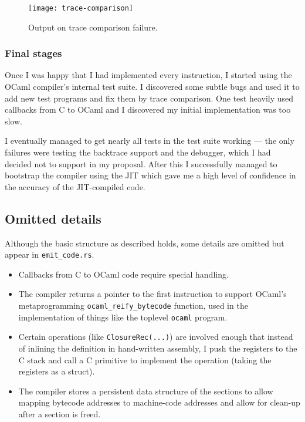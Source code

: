 \begin{figure}[h]
      \texttt{[image: trace-comparison]}
      \caption{Output on trace comparison failure.}
      \label{fig:trace-comparison}
\end{figure}

\subsubsection{Final stages}

Once I was happy that I had implemented every instruction, I started using
the OCaml compiler's internal test suite. I discovered some subtle bugs and used it to add new test
programs and fix them by trace comparison. One test heavily used callbacks from C to OCaml and I
discovered my initial implementation was too slow.

I eventually managed to get nearly all tests in the test suite working --- the only failures were
testing the backtrace support and the debugger, which I had decided not to support in my proposal.
After this I successfully managed to bootstrap the compiler using the JIT which gave me a high
level of confidence in the accuracy of the JIT-compiled code.

\subsection{Omitted details}

Although the basic structure as described holds, some details are omitted but appear in
\texttt{emit\_code.rs}.

\begin{itemize}
      \item Callbacks from C to OCaml code require special handling.
      \item The compiler returns a pointer to the first instruction to support OCaml's
            metaprogramming \texttt{ocaml\_reify\_bytecode} function, used in the implementation of
            things like the
            toplevel \texttt{ocaml} program.
      \item Certain operations (like \texttt{ClosureRec(...)}) are involved enough that instead of
            inlining the definition in
            hand-written assembly, I push the registers to the C stack and call a C primitive to
            implement the
            operation (taking the registers as a struct).
      \item The compiler stores a persistent data structure of the sections to allow mapping
            bytecode addresses to machine-code addresses and allow for clean-up after a section is
            freed.
\end{itemize}

